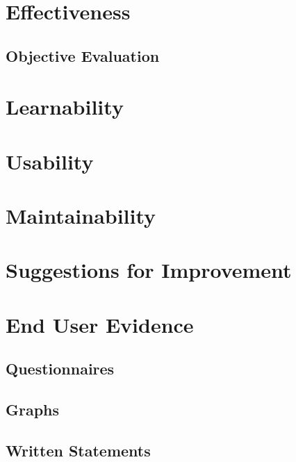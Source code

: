 \section{Effectiveness}

\subsection{Objective Evaluation}

\section{Learnability}

\section{Usability}

\section{Maintainability}

\section{Suggestions for Improvement}

\section{End User Evidence}

\subsection{Questionnaires}

\subsection{Graphs}

\subsection{Written Statements}

